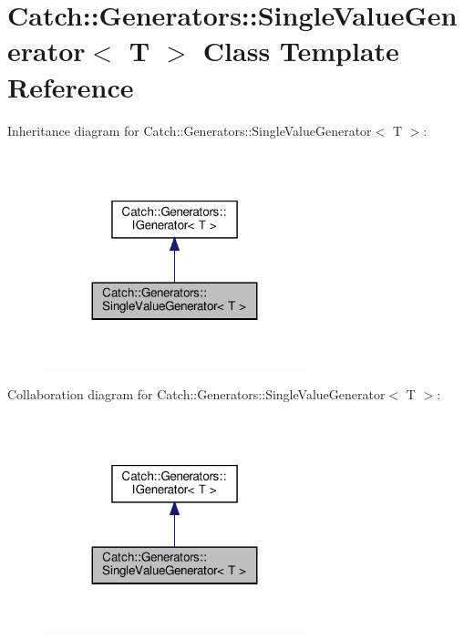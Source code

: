 \hypertarget{classCatch_1_1Generators_1_1SingleValueGenerator}{}\section{Catch\+::Generators\+::Single\+Value\+Generator$<$ T $>$ Class Template Reference}
\label{classCatch_1_1Generators_1_1SingleValueGenerator}


Inheritance diagram for Catch\+::Generators\+::Single\+Value\+Generator$<$ T $>$\+:\nopagebreak
\begin{figure}[H]
\begin{center}
\leavevmode
\includegraphics[width=215pt]{classCatch_1_1Generators_1_1SingleValueGenerator__inherit__graph}
\end{center}
\end{figure}


Collaboration diagram for Catch\+::Generators\+::Single\+Value\+Generator$<$ T $>$\+:\nopagebreak
\begin{figure}[H]
\begin{center}
\leavevmode
\includegraphics[width=215pt]{classCatch_1_1Generators_1_1SingleValueGenerator__coll__graph}
\end{center}
\end{figure}
